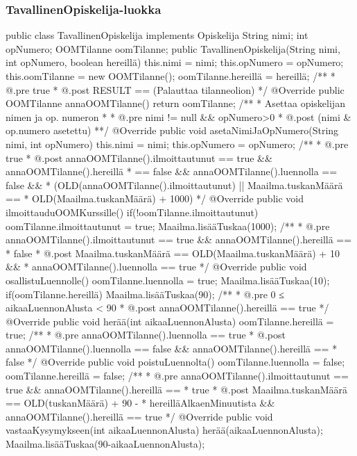 \subsubsection{TavallinenOpiskelija-luokka}
\label{TavallinenOpiskelija-luokka}
\begin{javacode}
public class TavallinenOpiskelija implements Opiskelija {
  String nimi;
  int opNumero;
  OOMTilanne oomTilanne;
  public TavallinenOpiskelija(String nimi, int opNumero, boolean hereillä) {
    this.nimi = nimi;
    this.opNumero = opNumero;
    this.oomTilanne = new OOMTilanne();
    oomTilanne.hereillä = hereillä;
  }
  /**
   * @.pre true
   * @.post RESULT == (Palauttaa tilanneolion)
   */
  @Override
  public OOMTilanne annaOOMTilanne() {
    return oomTilanne;
  }
  /**
   * Asettaa opiskelijan nimen ja op. numeron
   * 
   * @.pre nimi != null && opNumero>0
   * @.post (nimi & op.numero asetettu)
   **/
  @Override
  public void asetaNimiJaOpNumero(String nimi, int opNumero) {
    this.nimi = nimi;
    this.opNumero = opNumero;
  }
  /**
   * @.pre true
   * @.post annaOOMTilanne().ilmoittautunut == true && annaOOMTilanne().hereillä
   *        == false && annaOOMTilanne().luennolla == false &&
   *        (OLD(annaOOMTilanne().ilmoittautunut) || Maailma.tuskanMäärä ==
   *        OLD(Maailma.tuskanMäärä) + 1000)
   */
  @Override
  public void ilmoittauduOOMKurssille() {
    if(!oomTilanne.ilmoittautunut) {
      oomTilanne.ilmoittautunut = true;
      Maailma.lisääTuskaa(1000);
    }
  }
  /**
   * @.pre annaOOMTilanne().ilmoittautunut == true && annaOOMTilanne().hereillä ==
   *       false
   * @.post Maailma.tuskanMäärä == OLD(Maailma.tuskanMäärä) + 10 &&
   *        annaOOMTilanne().luennolla == true
   */
  @Override
  public void osallistuLuennolle() {
    oomTilanne.luennolla = true;
    Maailma.lisääTuskaa(10);
    if(oomTilanne.hereillä) {
      Maailma.lisääTuskaa(90);
    }
  }
  /**
   * @.pre 0 ≤ aikaaLuennonAlusta < 90
   * @.post annaOOMTilanne().hereillä == true
   */
  @Override
  public void herää(int aikaaLuennonAlusta) {
    oomTilanne.hereillä = true;
  }
  /**
   * @.pre annaOOMTilanne().luennolla == true
   * @.post annaOOMTilanne().luennolla == false && annaOOMTilanne().hereillä ==
   *        false
   */
  @Override
  public void poistuLuennolta() {
    oomTilanne.luennolla = false;
    oomTilanne.hereillä = false;
  }
  /**
   * @.pre annaOOMTilanne().ilmoittautunut == true && annaOOMTilanne().hereillä ==
   *       true
   * @.post Maailma.tuskanMäärä == OLD(tuskanMäärä) + 90 -
   *        hereilläAlkaenMinuutista && annaOOMTilanne().hereillä == true
   */
  @Override
  public void vastaaKysymykseen(int aikaaLuennonAlusta) {
    herää(aikaaLuennonAlusta);
    Maailma.lisääTuskaa(90-aikaaLuennonAlusta);
  }
}
\end{javacode}

